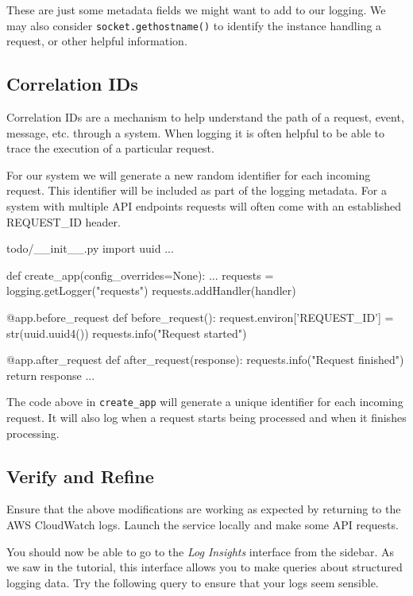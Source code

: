 \documentclass{csse4400}
\begin{document}
These are just some metadata fields we might want to add to our logging.
We may also consider \texttt{socket.gethostname()} to identify the instance handling a request, or other helpful information.

\subsection{Correlation IDs}

Correlation IDs are a mechanism to help understand the path of a request, event, message, etc. through a system.
When logging it is often helpful to be able to trace the execution of a particular request.

For our system we will generate a new random identifier for each incoming request.
This identifier will be included as part of the logging metadata.
For a system with multiple API endpoints requests will often come with an established REQUEST\_ID header.

\begin{code}[language=python,numbers=none]{todo/\_\_init\_\_.py}
import uuid
...

def create_app(config_overrides=None): 
    ...
    requests = logging.getLogger("requests")
    requests.addHandler(handler)

    @app.before_request
    def before_request():
       request.environ['REQUEST_ID'] = str(uuid.uuid4())
       requests.info("Request started")

    @app.after_request
    def after_request(response):
       requests.info("Request finished")
       return response
    ...
\end{code}

The code above in \texttt{create\_app} will generate a unique identifier for each incoming request.
It will also log when a request starts being processed and when it finishes processing.


\subsection{Verify and Refine}
Ensure that the above modifications are working as expected by returning to the AWS CloudWatch logs.
Launch the service locally and make some API requests.

You should now be able to go to the \textsl{Log Insights} interface from the sidebar.
As we saw in the tutorial,
this interface allows you to make queries about structured logging data.
Try the following query to ensure that your logs seem sensible.
\end{document}
